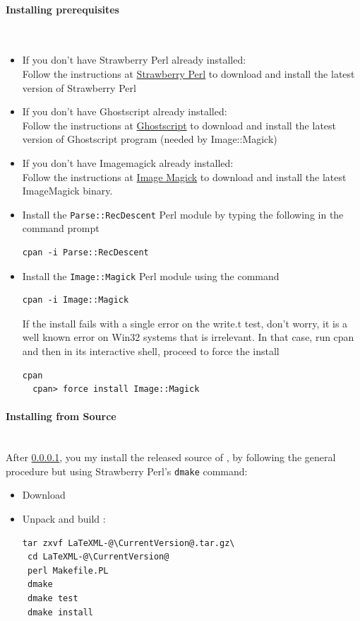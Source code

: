 \documentclass{article}
\begin{document}
\paragraph{Installing prerequisites}\label{install.windows.prerequisites}\\
\begin{itemize}
\item If you don't have Strawberry Perl already installed:\\
   Follow the instructions at \href{http://strawberryperl.com}{Strawberry Perl}
   to download and install the latest version of Strawberry Perl\\
\item If you don't have Ghostscript already installed:\\
   Follow the instructions at \href{http://sourceforge.net/projects/ghostscript/}{Ghostscript}
   to download and install the latest version of Ghostscript program
   (needed by Image::Magick)
\item If you don't have Imagemagick already installed:\\
   Follow the instructions at
   \href{http://www.imagemagick.org/script/binary-releases.php#windows}{Image Magick}
   to download and install the latest ImageMagick binary.
\item Install the \texttt{Parse::RecDescent} Perl module by typing the following in the command prompt
\begin{lstlisting}[style=shell]
  cpan -i Parse::RecDescent
\end{lstlisting}
\item Install the \texttt{Image::Magick} Perl module using the command
\begin{lstlisting}[style=shell]
  cpan -i Image::Magick
\end{lstlisting}
 If the install fails with a single error on the write.t test, don't worry,
it is a well known error on Win32 systems that is irrelevant.
In that case, run cpan and then in its interactive shell,
proceed to force the install
\begin{lstlisting}[style=shell]
  cpan
  cpan> force install Image::Magick
\end{lstlisting}
\end{itemize}

\paragraph{Installing from Source}\label{install.windows.source}\\
After \ref{install.windows.prerequisites},
you my install the released source of \LaTeXML,
by following the general procedure but using Strawberry Perl's \texttt{dmake} command:
\begin{itemize}
\item Download \CurrentTarball\\
\item Unpack and build \LaTeXML:
\begin{lstlisting}[style=shell]
 tar zxvf LaTeXML-@\CurrentVersion@.tar.gz\
 cd LaTeXML-@\CurrentVersion@
 perl Makefile.PL
 dmake
 dmake test
 dmake install
\end{lstlisting}
\end{itemize}
\end{document}
